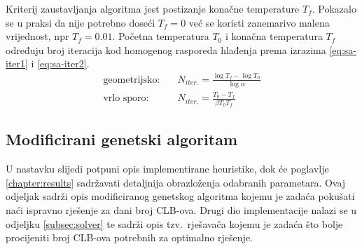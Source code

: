 \documentclass[times, utf8, diplomski]{fer}
\begin{document}
Kriterij zaustavljanja algoritma jest postizanje konačne temperature $T_{f}$. Pokazalo se u praksi da nije potrebno doseći $T_{f}=0$ već se koristi zanemarivo malena vrijednost, npr $T_{f}=0.01$. Početna temperatura $T_{0}$ i konačna temperatura $T_{f}$ određuju broj iteracija kod homogenog rasporeda hlađenja prema izrazima \ref{eq:sa-iter1} i \ref{eq:sa-iter2}.
%
\begin{align}
	\label{eq:sa-iter1}
	\text{geometrijsko:} \quad & N_{iter.} = \frac{\log T_{f} - \log T_{0}}{\log \alpha} \\
	\label{eq:sa-iter2}
	\text{vrlo sporo:} \quad & N_{iter.} = \frac{T_{0} - T_{f}}{\beta T_{0} T_{f}}
\end{align}

\subsection{Modificirani genetski algoritam} \label{subsec:implementation}

U nastavku slijedi potpuni opis implementirane heuristike, dok će poglavlje \ref{chapter:results} sadržavati detaljnija obrazloženja odabranih parametara. Ovaj odjeljak sadrži opis modificiranog genetskog algoritma kojemu je zadaća pokušati naći ispravno rješenje za dani broj CLB-ova. Drugi dio implementacije nalazi se u odjeljku \ref{subsec:solver} te sadrži opis tzv.~rješavača kojemu je zadaća što bolje procijeniti broj CLB-ova potrebnih za optimalno rješenje.
\end{document}
